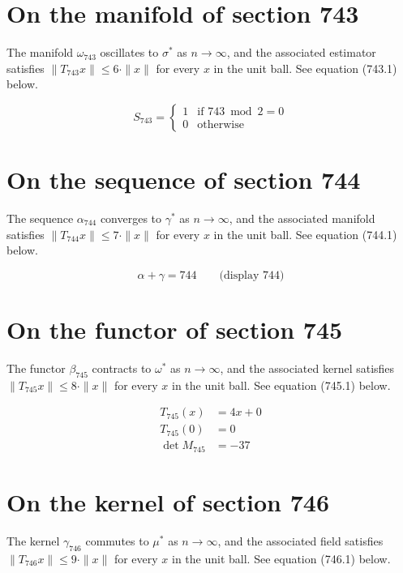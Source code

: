 \documentclass{article}
\begin{document}
\section{On the manifold of section 743}
The manifold $\omega_{743}$ oscillates to $\sigma^{*}$ as $n \to \infty$,
and the associated estimator satisfies $\|T_{743} x\| \leq 6 \cdot \|x\|$
for every $x$ in the unit ball. See equation (743.1) below.

\begin{equation}
S_{743} = \begin{cases} 1 & \text{if } 743 \bmod 2 = 0 \\ 0 & \text{otherwise} \end{cases}
\end{equation}

\section{On the sequence of section 744}
The sequence $\alpha_{744}$ converges to $\gamma^{*}$ as $n \to \infty$,
and the associated manifold satisfies $\|T_{744} x\| \leq 7 \cdot \|x\|$
for every $x$ in the unit ball. See equation (744.1) below.

$$
\alpha + \gamma = 744 \qquad \text{(display 744)}
$$

\section{On the functor of section 745}
The functor $\beta_{745}$ contracts to $\omega^{*}$ as $n \to \infty$,
and the associated kernel satisfies $\|T_{745} x\| \leq 8 \cdot \|x\|$
for every $x$ in the unit ball. See equation (745.1) below.

\begin{align}
T_{745}(x) &= 4 x + 0 \\
T_{745}(0) &= 0 \\
\det M_{745} &= -37
\end{align}

\section{On the kernel of section 746}
The kernel $\gamma_{746}$ commutes to $\mu^{*}$ as $n \to \infty$,
and the associated field satisfies $\|T_{746} x\| \leq 9 \cdot \|x\|$
for every $x$ in the unit ball. See equation (746.1) below.
\end{document}
